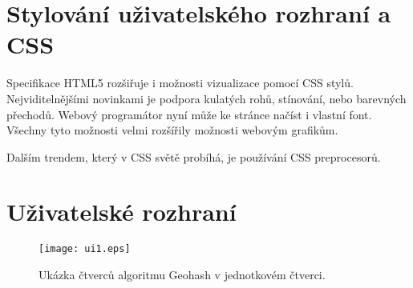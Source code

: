 \section{Stylování uživatelského rozhraní a CSS}

Specifikace HTML5 rozšiřuje i možnosti vizualizace pomocí CSS stylů. Nejviditelnějšími novinkami je podpora kulatých rohů, stínování, nebo barevných přechodů. Webový programátor nyní může ke stránce načíst i vlastní font. Všechny tyto možnosti velmi rozšířily možnosti webovým grafikům.

Dalším trendem, který v CSS světě probíhá, je používání CSS preprocesorů. 


\section{Uživatelské rozhraní}

\begin{figure}[h]
  \centering
  \texttt{[image: ui1.eps]}
  \caption{Ukázka čtverců algoritmu Geohash v jednotkovém čtverci.}
  \label{fig:ui1}
\end{figure}




